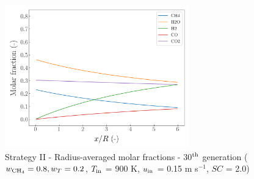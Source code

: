 \documentclass[preprint,12pt]{elsarticle}
\begin{document}
\begin{figure}[h!]
\centering
\includegraphics[width=80mm]{results/5Eq/80C_20T/GEN30-AVG.png}
\caption{\label{fig:5RES8020G30-avg} Strategy II - Radius-averaged molar fractions -  30$^{\rm{th}}$ generation ($w_{\rm{CH_4}} = 0.8, w_T = 0.2$, $T_{\rm{in}}$ = 900 K, $u_{\rm{in}}$ = 0.15 m s$^{-1}$, $SC$ = 2.0)}
\end{figure}
\end{document}
